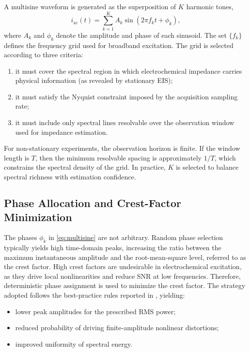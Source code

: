 A multisine waveform is generated as the superposition of $K$ harmonic tones,
\begin{equation}
    i_{\mathrm{ac}}(t) = \sum_{k=1}^{K} A_k \sin\left(2\pi f_k t + \phi_k\right),
    \label{eq:multisine}
\end{equation}
where $A_k$ and $\phi_k$ denote the amplitude and phase of each sinusoid. The set $\{f_k\}$ defines the frequency grid used for broadband excitation. The grid is selected according to three criteria:
\begin{enumerate}
    \item it must cover the spectral region in which electrochemical impedance carries physical information (as revealed by stationary EIS);
    \item it must satisfy the Nyquist constraint imposed by the acquisition sampling rate;
    \item it must include only spectral lines resolvable over the observation window used for impedance estimation.
\end{enumerate}

For non-stationary experiments, the observation horizon is finite. If the window length is $T$, then the minimum resolvable spacing is approximately $1/T$, which constrains the spectral density of the grid. In practice, $K$ is selected to balance spectral richness with estimation confidence.

\subsection{Phase Allocation and Crest-Factor Minimization}

The phases $\phi_k$ in \eqref{eq:multisine} are not arbitrary. Random phase selection typically yields high time-domain peaks, increasing the ratio between the maximum instantaneous amplitude and the root-mean-square level, referred to as the crest factor. High crest factors are undesirable in electrochemical excitation, as they drive local nonlinearities and reduce SNR at low frequencies. Therefore, deterministic phase assignment is used to minimize the crest factor. The strategy adopted follows the best-practice rules reported in \cite{}, yielding:
\begin{itemize}
    \item lower peak amplitudes for the prescribed RMS power;
    \item reduced probability of driving finite-amplitude nonlinear distortions;
    \item improved uniformity of spectral energy.
\end{itemize}

